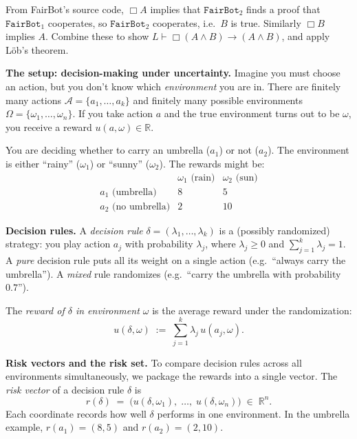 \documentclass[11pt]{article}
\begin{document}
\begin{exercise}
\begin{enumerate}
\begin{hint}

From FairBot's source code, $\Box A$ implies that
$\texttt{FairBot}_2$ finds a proof that $\texttt{FairBot}_1$ cooperates, so
$\texttt{FairBot}_2$ cooperates, i.e.\ $B$ is true. Similarly $\Box B$ implies $A$.
Combine these to show $L \vdash \Box(A \wedge B) \to (A \wedge B)$, and apply L\"ob's
theorem.
\end{hint}
\end{enumerate}
\end{exercise}


\begin{exercise}
\label{ex:complete-class}
\noindent
\textbf{The setup: decision-making under uncertainty.} Imagine you must choose an
action, but you don't know which \emph{environment} you are in. There are finitely
many actions $\mathcal{A} = \{a_1, \ldots, a_k\}$ and finitely many possible
environments $\Omega = \{\omega_1, \ldots, \omega_n\}$. If you take action $a$ and the
true environment turns out to be $\omega$, you receive a reward
$u(a, \omega) \in \mathbb{R}$.

\begin{example}
You are deciding whether to carry an umbrella ($a_1$) or not
($a_2$). The environment is either ``rainy'' ($\omega_1$) or ``sunny'' ($\omega_2$).
The rewards might be:
\[
\begin{array}{c|cc}
 & \omega_1 \text{ (rain)} & \omega_2 \text{ (sun)} \\
\hline
a_1 \text{ (umbrella)} & 8 & 5 \\
a_2 \text{ (no umbrella)} & 2 & 10
\end{array}
\]
\end{example}

\medskip
\noindent
\textbf{Decision rules.} A \emph{decision rule}
$\delta = (\lambda_1, \ldots, \lambda_k)$ is a (possibly randomized) strategy: you
play action $a_j$ with probability $\lambda_j$, where $\lambda_j \geq 0$ and
$\sum_{j=1}^k \lambda_j = 1$. A \emph{pure} decision rule puts all its weight on a
single action (e.g.\ ``always carry the umbrella''). A \emph{mixed} rule randomizes
(e.g.\ ``carry the umbrella with probability $0.7$'').

\medskip
\noindent
The \emph{reward of $\delta$ in environment $\omega$} is the average reward under
the randomization:
\[
  u(\delta, \omega) \;:=\; \sum_{j=1}^k \lambda_j\, u(a_j, \omega).
\]

\medskip
\noindent
\textbf{Risk vectors and the risk set.} To compare decision rules across all
environments simultaneously, we package the rewards into a single vector. The
\emph{risk vector} of a decision rule $\delta$ is
\[
  r(\delta) \;=\; \bigl(u(\delta, \omega_1),\; \ldots,\; u(\delta, \omega_n)\bigr)
  \;\in\; \mathbb{R}^n.
\]
Each coordinate records how well $\delta$ performs in one environment. In the umbrella
example, $r(a_1) = (8, 5)$ and $r(a_2) = (2, 10)$.


\end{exercise}
\end{document}
